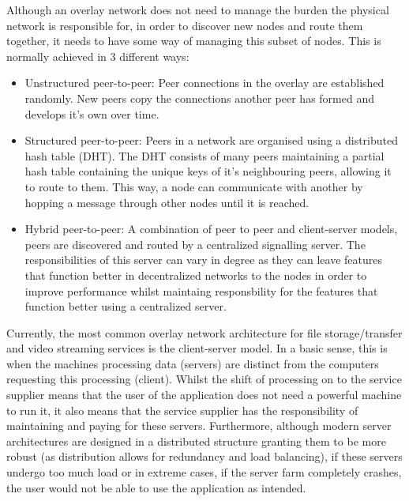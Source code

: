 \documentclass[]{report}
\begin{document}
			Although an overlay network does not need to manage the burden the physical network is responsible for, in order to discover new nodes and route them together, it needs to have some way of managing this subset of nodes. This is normally achieved in 3 different ways:
			\begin{itemize}
				\item Unstructured peer-to-peer:
					Peer connections in the overlay are established randomly. New peers copy the connections another peer has formed and develops it's own over time. \cite{P2P overlay networks}
				\item Structured peer-to-peer:
					Peers in a network are organised using a distributed hash table (DHT). The DHT consists of many peers maintaining a partial hash table containing the unique keys of it's neighbouring peers, allowing it to route to them. This way, a node can communicate with another by hopping a message through other nodes until it is reached. \cite{P2P overlay networks}
				\item Hybrid peer-to-peer:
					A combination of  peer to peer and client-server models, peers are discovered and routed by a centralized signalling server. The responsibilities of this server can vary in degree as they can leave features that function better in decentralized networks to the nodes in order to improve performance whilst maintaing responsbility for the features that function better using a centralized server.\cite{Hybrid P2P network}
			\end{itemize}
					
			Currently, the most common overlay network architecture for file storage/transfer and video streaming services is the client-server model. In a basic sense, this is when the machines processing data (servers) are distinct from the computers requesting this processing (client). Whilst the shift of processing on to the service supplier means that the user of the application does not need a powerful machine to run it, it also means that the service supplier has the responsibility of maintaining and paying for these servers. Furthermore, although modern server architectures are designed in a distributed structure granting them to be more robust (as distribution allows for redundancy and load balancing), if these servers undergo too much load or in extreme cases, if the server farm completely crashes, the user would not be able to use the application as intended.
			
\end{document}
